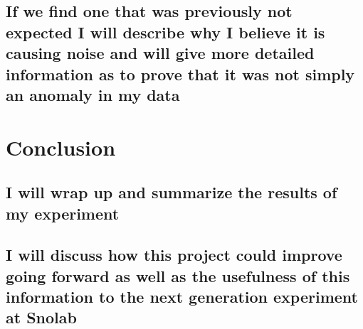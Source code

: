 \subsection{If we find one that was previously not expected I will describe why I believe it is causing noise and will give more detailed information as to prove that it was not simply an anomaly in my data}
\section{Conclusion}
\subsection{I will wrap up and summarize the results of my experiment}

\subsection{I will discuss how this project could improve going forward as well as the usefulness of this information to the next generation experiment at Snolab}

